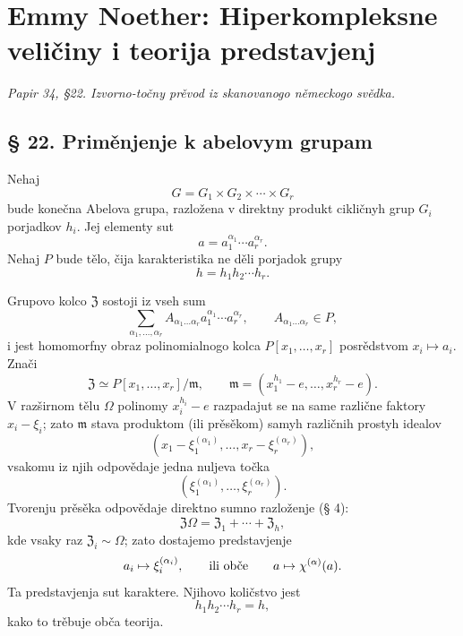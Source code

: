 \documentclass[11pt]{article}
\providecommand{\mZ}{\mathfrak{Z}}
\begin{document}
\section*{Emmy Noether: Hiperkompleksne veličiny i teorija predstavjenj}
\emph{Papir 34, §22. Izvorno-točny prěvod iz skanovanogo německogo svědka.}

\subsection*{§ 22. Priměnjenje k abelovym grupam}

Nehaj
\[
        G=G_1\times G_2\times\cdots\times G_r
\]
bude konečna Abelova grupa, razložena v direktny produkt cikličnyh grup $G_i$ porjadkov $h_i$. Jej elementy sut
\[
        a=a_1^{\alpha_1}\cdots a_r^{\alpha_r}.
\]
Nehaj $P$ bude tělo, čija karakteristika ne děli porjadok grupy
\[
        h=h_1h_2\cdots h_r.
\]

Grupovo kolco $\mZ$ sostoji iz vseh sum
\[
        \sum_{\alpha_1,\ldots,\alpha_r}
        A_{\alpha_1\ldots\alpha_r}a_1^{\alpha_1}\cdots a_r^{\alpha_r},
        \qquad A_{\alpha_1\ldots\alpha_r}\in P,
\]
i jest homomorfny obraz polinomialnogo kolca $P[x_1,\ldots,x_r]$ posrědstvom $x_i\mapsto a_i$. Znači
\[
        \mZ\simeq P[x_1,\ldots,x_r]/\mathfrak m,
        \qquad
        \mathfrak m=(x_1^{h_1}-e,\ldots,x_r^{h_r}-e).
\]
V razširnom tělu $\Omega$ polinomy $x_i^{h_i}-e$ razpadajut se na same različne faktory $x_i-\xi_i$; zato $\mathfrak m$ stava produktom (ili prěsěkom) samyh različnih prostyh idealov
\[
        (x_1-\xi_1^{(\alpha_1)},\ldots,x_r-\xi_r^{(\alpha_r)}),
\]
vsakomu iz njih odpovědaje jedna nuljeva točka
\[
        (\xi_1^{(\alpha_1)},\ldots,\xi_r^{(\alpha_r)}).
\]
Tvorenju prěsěka odpovědaje direktno sumno razloženje (§ 4):
\[
        \mZ\Omega=\mZ_1+\cdots+\mZ_h,
\]
kde vsaky raz $\mZ_i\sim\Omega$; zato dostajemo predstavjenje
\[
        a_i\mapsto \xi_i^{(\alpha_i)},
        \qquad\hbox{ili obče}\qquad
        a\mapsto \chi^{(\alpha)}(a).
\]
Ta predstavjenja sut karaktere. Njihovo količstvo jest
\[
        h_1h_2\cdots h_r=h,
\]
kako to trěbuje obča teorija.
\end{document}
